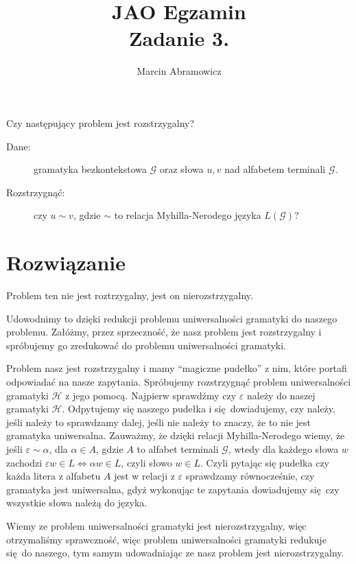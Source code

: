 \documentclass[a4paper]{article}
\title{JAO Egzamin\\ Zadanie 3.}
\author{Marcin Abramowicz}
\newcommand{\eps}{\varepsilon}%
\newcommand{\aut}[1]{\mathcal {#1}}%
\newcommand{\gram}[1]{\mathcal {#1}}%
\newcommand{\lang}{L}%
\begin{document}
\maketitle
Czy następujący problem jest rozstrzygalny?
\begin{description}
\item [Dane:]gramatyka bezkontekstowa $\gram G$ oraz słowa $u, v$ nad alfabetem terminali $\gram G$.
\item [Rozstrzygnąć:]czy $u\sim v$, gdzie $\sim$ to relacja Myhilla-Nerodego języka $\lang(\gram G)$?
\end{description}

\section*{Rozwiązanie}

Problem ten nie jest roztrzygalny, jest on nierozstrzygalny.

Udowodnimy to dzięki redukcji problemu uniwersalności gramatyki do naszego problemu. Załóżmy, przez sprzeczność, że nasz problem jest rozstrzygalny i spróbujemy go zredukować do problemu uniwersalności gramatyki.

Problem nasz jest rozstrzygalny i mamy ``magiczne pudełko'' z nim, które portafi odpowiadać na nasze zapytania. Spróbujemy rozstrzygnąć problem uniwersalności gramatyki $\gram H$ z jego pomocą. Najpierw sprawdźmy czy $\eps$ należy do naszej gramatyki $\gram H$. Odpytujemy się naszego pudełka i się dowiadujemy, czy należy, jeśli należy to sprawdzamy dalej, jeśli nie należy to znaczy, że to nie jest gramatyka uniwersalna. Zauważmy, że dzięki relacji Myhilla-Nerodego wiemy, że jeśli $\eps \sim \alpha$, dla $\alpha \in A$, gdzie $A$ to alfabet terminali $\gram G$, wtedy dla każdego słowa $w$ zachodzi $\eps w \in \lang \iff \alpha w \in \lang$, czyli słowo $w \in \lang$. Czyli  pytając się pudełka czy każda litera z alfabetu $A$ jest w relacji z $\eps$ sprawdzamy równocześnie, czy gramatyka jest uniwersalna, gdyż wykonując te zapytania dowiadujemy się czy wszystkie słowa należą do języka.

Wiemy ze problem uniwersalności gramatyki jest nierozstrzygalny, więc otrzymaliśmy sprawczność, więc problem uniwersalności gramatyki redukuje się do naszego, tym samym udowadniając ze nasz problem jest nierozstrzygalny.
\end{document}
